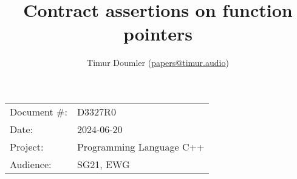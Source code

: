 

 \usepackage[bottom]{footmisc} 

 \usepackage{longtable}


\usepackage{tikz,lipsum,lmodern}
\usepackage[most]{tcolorbox}



\usepackage{titlesec}
\usepackage{tocloft}


\newcommand{\changelocaltocdepth}[1]{%
  \addtocontents{toc}{\protect\setcounter{tocdepth}{#1}}%
  \setcounter{tocdepth}{#1}%
}

\setcounter{tocdepth}{3}



\title{Contract assertions on function pointers}
\author{ Timur Doumler \small(\href{mailto:papers@timur.audio}{papers@timur.audio}) 
}
\date{}
\maketitle

\begin{tabular}{ll}
Document \#: & D3327R0 \\
Date: &2024-06-20 \\
Project: & Programming Language C++ \\
Audience: & SG21, EWG
\end{tabular}

